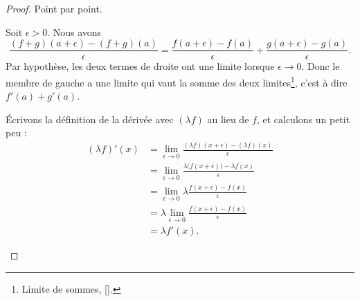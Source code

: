 \begin{proof}
	Point par point.
	\begin{subproof}
        Soit \( \epsilon>0\). Nous avons
        \begin{equation}
            \frac{ (f+g)(a+\epsilon)-(f+g)(a) }{ \epsilon }=\frac{ f(a+\epsilon)-f(a) }{ \epsilon }+\frac{ g(a+\epsilon)-g(a) }{ \epsilon }.
        \end{equation}
        Par hypothèse, les deux termes de droite ont une limite lorsque \( \epsilon\to 0\). Donc le membre de gauche a une limite qui vaut la somme des deux limites\footnote{Limite de sommes, \ref{}.}, c'est à dire \( f'(a)+g'(a)\).

		Écrivons la définition de la dérivée avec \( (\lambda f)\) au lieu de \( f\), et calculons un petit peu :
		\begin{subequations}
			\begin{align}
				(\lambda f)'(x) & =\lim_{\epsilon\to 0}\frac{ (\lambda f)(x+\epsilon)-(\lambda f)(x) }{ \epsilon }         \\
				                & =\lim_{\epsilon\to 0}\frac{ \lambda \big( f(x+\epsilon) \big)-\lambda f(x) }{ \epsilon } \\
				                & =\lim_{\epsilon\to 0}\lambda \frac{ f(x+\epsilon) -f(x) }{ \epsilon }                    \\
				                & =\lambda \lim_{\epsilon\to 0}\frac{ f(x+\epsilon) -f(x) }{ \epsilon }                    \\
				                & =\lambda f'(x).
			\end{align}
		\end{subequations}


\end{subproof}
\end{proof}
